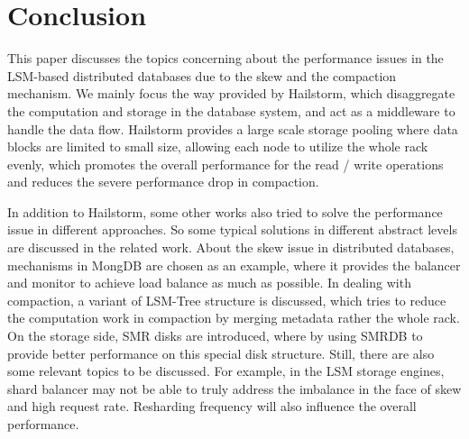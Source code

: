 \documentclass[a4paper,10pt,twoside]{article}
\begin{document}
\section{Conclusion}
This paper discusses the topics concerning about the performance issues in the LSM-based distributed databases due to the skew and the compaction mechanism.
We mainly focus the way provided by Hailstorm, which disaggregate the computation and storage in the database system, and act as a middleware to handle the data flow.
Hailstorm provides a large scale storage pooling where data blocks are limited to small size, allowing each node to utilize the whole rack evenly, 
which promotes the overall performance for the read / write operations and reduces the severe performance drop in compaction.
\par
In addition to Hailstorm, some other works also tried to solve the performance issue in different approaches.
So some typical solutions in different abstract levels are discussed in the related work.
About the skew issue in distributed databases, mechanisms in MongDB are chosen as an example, where it provides the balancer and monitor to achieve load balance as much as possible.
In dealing with compaction, a variant of LSM-Tree structure is discussed, which tries to reduce the computation work in compaction by merging metadata rather the whole rack.
On the storage side, SMR disks are introduced, where by using SMRDB to provide better performance on this special disk structure.
Still, there are also some relevant topics to be discussed. 
For example, in the LSM storage engines, shard balancer may not be able to truly address the imbalance in the face of skew and high request rate.
Resharding frequency will also influence the overall performance.

\newpage

 
\end{document}
